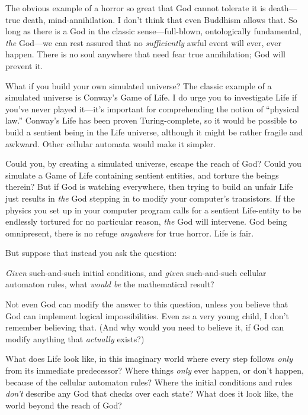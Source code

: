 {
 The obvious example of a horror so great that God cannot tolerate
it is death---true death, mind-annihilation. I don't
think that even Buddhism allows that. So long as there is a God in the
classic sense---full-blown, ontologically fundamental, \textit{the}
God---we can rest assured that no \textit{sufficiently} awful event
will ever, ever happen. There is no soul anywhere that need fear true
annihilation; God will prevent it.}

{
 What if you build your own simulated universe? The classic example
of a simulated universe is Conway's Game of Life. I do
urge you to investigate Life if you've never played
it---it's important for comprehending the notion of
``physical law.''
Conway's Life has been proven Turing-complete, so it
would be possible to build a sentient being in the Life universe,
although it might be rather fragile and awkward. Other cellular
automata would make it simpler.}

{
 Could you, by creating a simulated universe, escape the reach of
God? Could you simulate a Game of Life containing sentient entities,
and torture the beings therein? But if God is watching everywhere, then
trying to build an unfair Life just results in \textit{the} God
stepping in to modify your computer's transistors. If
the physics you set up in your computer program calls for a sentient
Life-entity to be endlessly tortured for no particular reason,
\textit{the} God will intervene. God being omnipresent, there is no
refuge \textit{anywhere} for true horror. Life is fair.}

{
 But suppose that instead you ask the question:}

{
 \textit{Given} such-and-such initial conditions, and
\textit{given} such-and-such cellular automaton rules, what
\textit{would be} the mathematical result?}

{
 Not even God can modify the answer to this question, unless you
believe that God can implement logical impossibilities. Even as a very
young child, I don't remember believing that. (And why
would you need to believe it, if God can modify anything that
\textit{actually} exists?)}

{
 What does Life look like, in this imaginary world where every step
follows \textit{only} from its immediate predecessor? Where things
\textit{only} ever happen, or don't happen, because of
the cellular automaton rules? Where the initial conditions and rules
\textit{don't} describe any God that checks over each
state? What does it look like, the world beyond the reach of God?}

